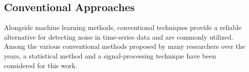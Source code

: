 \documentclass[conference]{IEEEtran}
\begin{document}



\subsection{Conventional Approaches} Alongside machine learning methods, conventional techniques provide a reliable alternative for detecting noise in time-series data and are commonly utilized. Among the various conventional methods proposed by many researchers over the years, a statistical method and a signal-processing technique have been considered for this work.
\end{document}
